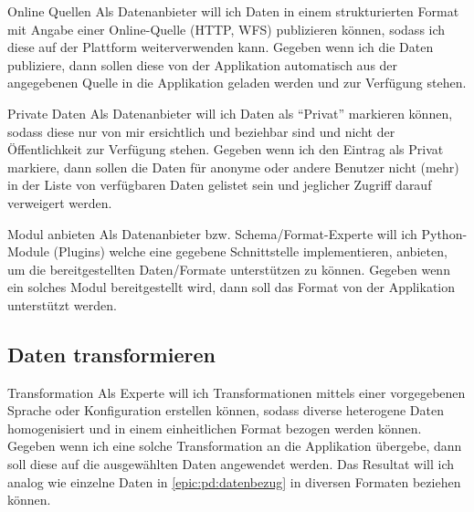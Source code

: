 \begin{scrumstory}[label=story:pd:online-quelle]{Online Quellen}
	Als Datenanbieter will ich Daten in einem strukturierten Format mit Angabe einer Online-Quelle (HTTP, WFS) publizieren können, sodass ich diese auf der Plattform weiterverwenden kann.
	\storyacceptance	
	Gegeben
	wenn ich die Daten publiziere, dann sollen diese von der Applikation automatisch aus der angegebenen Quelle in die Applikation geladen werden und zur Verfügung stehen.
\end{scrumstory}

\begin{scrumstory}[label=story:pd:private-daten]{Private Daten}
	Als Datenanbieter will ich Daten als ``Privat'' markieren können, sodass diese nur von mir ersichtlich und beziehbar sind und nicht der Öffentlichkeit zur Verfügung stehen.
	\storyacceptance	
	Gegeben
	wenn ich den Eintrag als Privat markiere, dann sollen die Daten für anonyme oder andere Benutzer nicht (mehr) in der Liste von verfügbaren Daten gelistet sein und jeglicher Zugriff darauf verweigert werden.
\end{scrumstory}

\begin{scrumstory}[label=story:pd:parser]{Modul anbieten}
	Als Datenanbieter bzw. Schema/Format-Experte will ich Python-Module (Plugins) welche eine gegebene Schnittstelle implementieren, anbieten, um die bereitgestellten Daten/Formate unterstützen zu können.
	\storyacceptance	
	Gegeben
	wenn ein solches Modul bereitgestellt wird, dann soll das Format von der Applikation unterstützt werden.
\end{scrumstory}


\subsection{Daten transformieren}

\begin{scrumepic}[label=epic:pd:transformation]{Transformation}
	Als Experte will ich Transformationen mittels einer vorgegebenen Sprache oder Konfiguration erstellen können, sodass diverse heterogene Daten homogenisiert und in einem einheitlichen Format bezogen werden können.
	\storyacceptance	
	Gegeben
	wenn ich eine solche Transformation an die Applikation übergebe, dann soll diese auf die ausgewählten Daten angewendet werden. Das Resultat will ich analog wie einzelne Daten in \cref{epic:pd:datenbezug} in diversen Formaten beziehen können.
\end{scrumepic}

